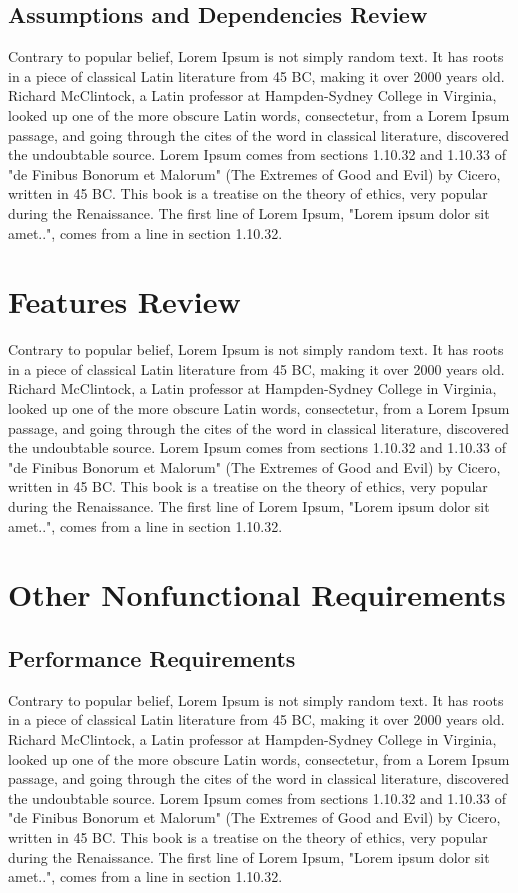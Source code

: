 \documentclass{scrreprt}
\begin{document}
    \section{Assumptions and Dependencies Review}
    Contrary to popular belief, Lorem Ipsum is not simply random text. It has roots in a piece of classical Latin literature from 45 BC, making it over 2000 years old. Richard McClintock, a Latin professor at Hampden-Sydney College in Virginia, looked up one of the more obscure Latin words, consectetur, from a Lorem Ipsum passage, and going through the cites of the word in classical literature, discovered the undoubtable source. Lorem Ipsum comes from sections 1.10.32 and 1.10.33 of "de Finibus Bonorum et Malorum" (The Extremes of Good and Evil) by Cicero, written in 45 BC. This book is a treatise on the theory of ethics, very popular during the Renaissance. The first line of Lorem Ipsum, "Lorem ipsum dolor sit amet..", comes from a line in section 1.10.32.
    \chapter{Features Review}  
    Contrary to popular belief, Lorem Ipsum is not simply random text. It has roots in a piece of classical Latin literature from 45 BC, making it over 2000 years old. Richard McClintock, a Latin professor at Hampden-Sydney College in Virginia, looked up one of the more obscure Latin words, consectetur, from a Lorem Ipsum passage, and going through the cites of the word in classical literature, discovered the undoubtable source. Lorem Ipsum comes from sections 1.10.32 and 1.10.33 of "de Finibus Bonorum et Malorum" (The Extremes of Good and Evil) by Cicero, written in 45 BC. This book is a treatise on the theory of ethics, very popular during the Renaissance. The first line of Lorem Ipsum, "Lorem ipsum dolor sit amet..", comes from a line in section 1.10.32.
    \chapter{Other Nonfunctional Requirements}
    \section{Performance Requirements} 
    Contrary to popular belief, Lorem Ipsum is not simply random text. It has roots in a piece of classical Latin literature from 45 BC, making it over 2000 years old. Richard McClintock, a Latin professor at Hampden-Sydney College in Virginia, looked up one of the more obscure Latin words, consectetur, from a Lorem Ipsum passage, and going through the cites of the word in classical literature, discovered the undoubtable source. Lorem Ipsum comes from sections 1.10.32 and 1.10.33 of "de Finibus Bonorum et Malorum" (The Extremes of Good and Evil) by Cicero, written in 45 BC. This book is a treatise on the theory of ethics, very popular during the Renaissance. The first line of Lorem Ipsum, "Lorem ipsum dolor sit amet..", comes from a line in section 1.10.32. 
\end{document}

